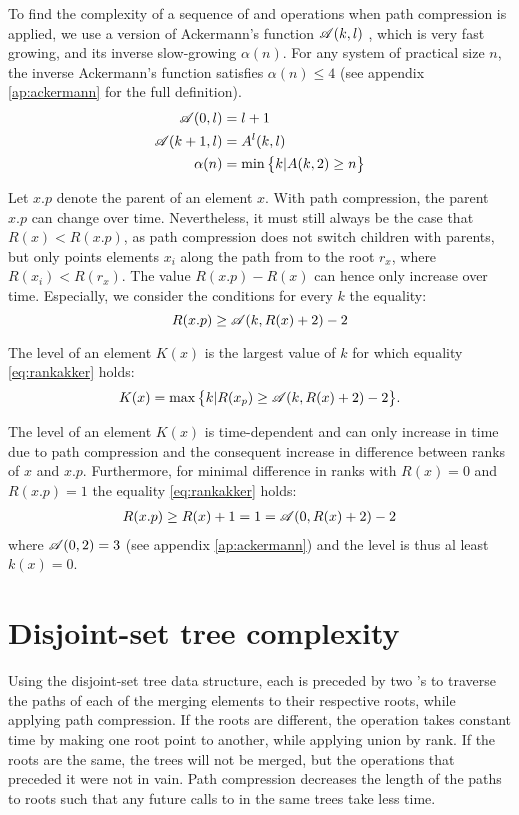To find the complexity of a sequence of  and  operations when path compression is applied, we use a version of Ackermann's function $\mathscr{A}(k,l)$ \cite{ackermann1928hilbertschen, kozen1992design}, which is very fast growing, and its inverse slow-growing $\alpha(n)$. For any system of practical size $n$, the inverse Ackermann's function satisfies $\alpha(n)\leq 4$ (see appendix \ref{ap:ackermann} for the full definition). 
\begin{align}
  \nonumber \mathscr{A}(0,l) &= l + 1\\
  \mathscr{A}(k+1,l) &= A^l(k,l) \\
  \nonumber \alpha(n) &= \min\big\{k | A(k,2) \geq n \big\}
\end{align}

Let $x.p$ denote the parent of an element $x$. With path compression, the parent $x.p$ can change over time. Nevertheless, it must still always be the case that $R(x)<R(x.p)$, as path compression does not switch children with parents, but only points elements $x_i$ along the path from to the root $r_x$, where $R(x_i)<R(r_x)$. The value $R(x.p) - R(x)$ can hence only increase over time. Especially, we consider the conditions for every $k$ the equality:
\begin{equation}\label{eq:rankakker}
  R(x.p)\geq \mathscr{A}(k,R(x)+2)-2
\end{equation}
\begin{definition}
  The level of an element $K(x)$ is the largest value of $k$ for which equality \eqref{eq:rankakker} holds: 
  \begin{equation}
    K(x) = \max \big\{ k |  R(x_p)\geq \mathscr{A}(k,R(x)+2)-2\big\}.
  \end{equation}
\end{definition}
The level of an element $K(x)$ is time-dependent and can only increase in time due to path compression and the consequent increase in difference between ranks of $x$ and $x.p$. Furthermore, for minimal difference in ranks with $R(x) = 0$ and $R(x.p)=1$ the equality \eqref{eq:rankakker} holds:
\begin{eqnarray*}
  R(x.p) \geq R(x) + 1 = 1 = \mathscr{A}(0,R(x) + 2)-2
\end{eqnarray*}
where $\mathscr{A}(0,2)=3$ (see appendix \ref{ap:ackermann}) and the level is thus al least $k(x)=0$. 

\section{Disjoint-set tree complexity}
Using the disjoint-set tree data structure, each  is preceded by two 's to traverse the paths of each of the merging elements to their respective roots, while applying path compression. If the roots are different, the  operation takes constant time by making one root point to another, while applying union by rank. If the roots are the same, the trees will not be merged, but the  operations that preceded it were not in vain. Path compression decreases the length of the paths to roots such that any future calls to  in the same trees take less time.

